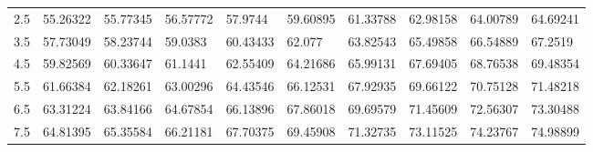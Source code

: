 \documentclass[10pt,twocolumn,letterpaper]{article}
\begin{document}
\begin{table}
{\begin{tabular}{llllllllll}
    2.5             & 55.26322                               & 55.77345                               & 56.57772                                & 57.9744                                 & 59.60895                                & 61.33788                                & 62.98158                                & 64.00789                                & 64.69241                                \\
    3.5             & 57.73049                               & 58.23744                               & 59.0383                                 & 60.43433                                & 62.077                                  & 63.82543                                & 65.49858                                & 66.54889                                & 67.2519                                 \\
    4.5             & 59.82569                               & 60.33647                               & 61.1441                                 & 62.55409                                & 64.21686                                & 65.99131                                & 67.69405                                & 68.76538                                & 69.48354                                \\
    5.5             & 61.66384                               & 62.18261                               & 63.00296                                & 64.43546                                & 66.12531                                & 67.92935                                & 69.66122                                & 70.75128                                & 71.48218                                \\
    6.5             & 63.31224                               & 63.84166                               & 64.67854                                & 66.13896                                & 67.86018                                & 69.69579                                & 71.45609                                & 72.56307                                & 73.30488                                \\
    7.5             & 64.81395                               & 65.35584                               & 66.21181                                & 67.70375                                & 69.45908                                & 71.32735                                & 73.11525                                & 74.23767                                & 74.98899                                \\

\end{tabular}}
\end{table}
\end{document}
